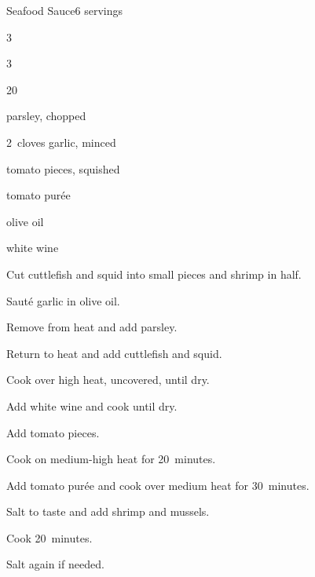 \begin{recipe}{Seafood Sauce}{}{6 servings}

\begin{ingredients}
\item 3~
\item 3~
\item \lbs{\half} 
\item 20~
\item \C{\half} parsley, chopped
\item 2~cloves garlic, minced
\item {} tomato pieces, squished
\item {} tomato pur\'ee
\item \C{\half} olive oil
\item {} white wine
\end{ingredients}

\begin{directions}
\item Cut cuttlefish and squid into small pieces and shrimp in half.
\item Saut\'e garlic in olive oil.
\item Remove from heat and add parsley.
\item Return to heat and add cuttlefish and squid.
\item Cook over high heat, uncovered, until dry.
\item Add white wine and cook until dry.
\item Add tomato pieces.
\item Cook on medium-high heat for 20~minutes.
\item Add tomato pur\'ee and cook over medium heat for 30~minutes.
\item Salt to taste and add shrimp and mussels.
\item Cook 20~minutes.
\item Salt again if needed.
\end{directions}

\end{recipe}
